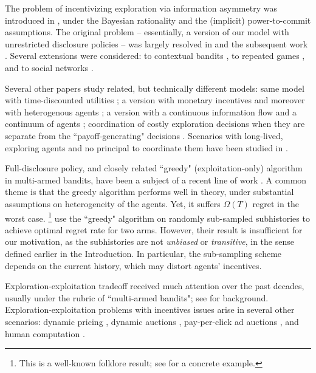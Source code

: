 The problem of incentivizing exploration via information asymmetry was introduced in \cite{Kremer-JPE14}, under the Bayesian rationality and the (implicit) power-to-commit assumptions. The original problem -- essentially, a version of our model with unrestricted disclosure policies -- was largely resolved in \cite{Kremer-JPE14} and the subsequent work \citep{ICexploration-ec15,ICexplorationGames-ec16}. Several extensions were considered: to contextual bandits \citep{ICexploration-ec15}, to repeated games
\citep{ICexplorationGames-ec16}, and to social networks \citep{Bahar-ec16}.

Several other papers study related, but technically different models: same model with time-discounted utilities \citep{Bimpikis-exploration-ms17}; a version with monetary incentives \citep{Frazier-ec14} and moreover with heterogenous agents \citep{Kempe-colt18}; a version with a continuous information flow and a continuum of agents \citep{Che-13}; coordination of costly exploration decisions when they are separate from the ``payoff-generating" decisions \citep{Bobby-Glen-ec16,Annie-ec18-traps,Liang-ec18}. Scenarios with long-lived, exploring agents and no principal to coordinate them have been studied in \citep{Bolton-econometrica99,Keller-econometrica05}.

Full-disclosure policy, and closely related ``greedy" (exploitation-only) algorithm in multi-armed bandits, have been a subject of a recent line of work \citep{Sven-aistats18,kannan2018smoothed,bastani2017exploiting,externalities-colt18}.
A common theme is that the greedy algorithm performs well in theory, under  substantial assumptions on heterogeneity of the agents. Yet, it suffers $\Omega(T)$ regret in the worst case.%
\footnote{This is a well-known folklore result; \eg see \citep{CompetingBandits-itcs18} for a concrete example.}
\citet{Baransi-ecml14} use the ``greedy" algorithm on randomly sub-sampled subhistories to achieve optimal regret rate for two arms. However, their result is insufficient for our motivation, as the subhistories are not \emph{unbiased} or \emph{transitive}, in the sense defined earlier in the Introduction. In particular, the sub-sampling scheme depends on the current history, which may distort agents' incentives.  

Exploration-exploitation tradeoff received much attention over the past decades, usually under the rubric of ``multi-armed bandits"; see  \citep{Bubeck-survey12,Gittins-book11} for background.
Exploration-exploitation problems with incentives issues arise in several other scenarios: dynamic pricing
    \citep{KleinbergL03,BZ09,BwK-focs13},
dynamic auctions
    \citep{AtheySegal-econometrica13,DynPivot-econometrica10,Kakade-pivot-or13},
pay-per-click ad auctions
    \citep{MechMAB-ec09,DevanurK09,Transform-ec10-jacm},
and human computation
    \citep{RepeatedPA-ec14,Ghosh-itcs13,Krause-www13}.
